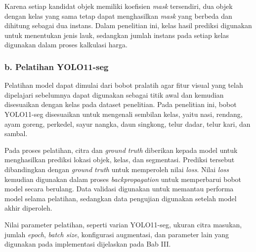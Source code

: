 Karena setiap kandidat objek memiliki koefisien \textit{mask} tersendiri, dua objek dengan kelas yang sama tetap dapat menghasilkan \textit{mask} yang berbeda dan dihitung sebagai dua instans. Dalam penelitian ini, kelas hasil prediksi digunakan untuk menentukan jenis lauk, sedangkan jumlah instans pada setiap kelas digunakan dalam proses kalkulasi harga.

\subsubsection*{b. Pelatihan YOLO11-seg}

Pelatihan model dapat dimulai dari bobot pralatih agar fitur visual yang telah dipelajari sebelumnya dapat digunakan sebagai titik awal dan kemudian disesuaikan dengan kelas pada dataset penelitian. Pada penelitian ini, bobot YOLO11-seg disesuaikan untuk mengenali sembilan kelas, yaitu nasi, rendang, ayam goreng, perkedel, sayur nangka, daun singkong, telur dadar, telur kari, dan sambal.

Pada proses pelatihan, citra dan \textit{ground truth} diberikan kepada model untuk menghasilkan prediksi lokasi objek, kelas, dan segmentasi. Prediksi tersebut dibandingkan dengan \textit{ground truth} untuk memperoleh nilai \textit{loss}. Nilai \textit{loss} kemudian digunakan dalam proses \textit{backpropagation} untuk memperbarui bobot model secara berulang. Data validasi digunakan untuk memantau performa model selama pelatihan, sedangkan data pengujian digunakan setelah model akhir diperoleh.

Nilai parameter pelatihan, seperti varian YOLO11-seg, ukuran citra masukan, jumlah \textit{epoch}, \textit{batch size}, konfigurasi augmentasi, dan parameter lain yang digunakan pada implementasi dijelaskan pada Bab III.
